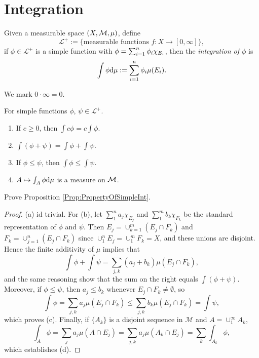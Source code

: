 \section{Integration}
\begin{defn}
    \label{Defn:IntegralOfSimpleFunc}
    Given a measurable space $(X,\mathcal{M},\mu)$, define 
    \begin{displaymath}
        \mathcal{L}^{+}:=\{\text{measurable functions }f:
        X\rightarrow[0,\infty]\},
    \end{displaymath}
    if $\phi\in \mathcal{L}^{+}$ is a simple function with 
    $\phi=\sum_{i=1}^{n}\phi_{i}\chi_{E_i}$, then 
    the \textit{integration of $\phi$} is 
    \begin{displaymath}
        \int\phi\mathrm{d}\mu:=\sum_{i=1}^{n}\phi_{i}\mu(E_i).
    \end{displaymath}
\end{defn}
\begin{rem}
    We mark $0\cdot\infty=0$.
\end{rem}
\begin{prop}
    \label{Prop:PropertyOfSimpleInt}
    For simple functions $\phi$, $\psi\in\mathcal{L}^{+}$. 
    \begin{enumerate}
        \item If $c\ge 0$, then $\int c\phi=c\int\phi$. 
        \item $\int(\phi+\psi)=\int\phi+\int\psi$.
        \item If $\phi\le\psi$, then $\int\phi\le\int\psi$. 
        \item $A\mapsto \int_{A}\phi\mathrm{d}\mu$ is a measure on $\mathcal{M}$.
    \end{enumerate}
\end{prop}
\begin{exc}
    Prove Proposition \ref{Prop:PropertyOfSimpleInt}.
\end{exc}
\begin{proof}
    (a) id trivial. For (b), let $\sum_{1}^{n}a_j\chi_{E_j}$ and 
    $\sum_{1}^{m}b_k\chi_{F_k}$ be the standard representation of 
    $\phi$ and $\psi$. Then $E_j=\cup_{k=1}^{m}(E_j\cap F_k)$ and
    $F_k=\cup_{j=1}^{n}(E_j\cap F_k)$ since $\cup_{1}^{n}E_j=
    \cup_{1}^{m}F_k=X$, and these unions are disjoint. Hence the
    finite additivity of $\mu$ implies that
    \begin{displaymath}
        \int\phi+\int\psi=\sum_{j,k}(a_j+b_k)\mu(E_j\cap F_k),
    \end{displaymath}
    and the same reasoning show that the sum on the right equals
    $\int(\phi+\psi)$. Moreover, if $\phi\leq\psi$, then $a_j\leq b_k$
    whenever $E_j\cap F_k\neq\emptyset$, so
    \begin{displaymath}
        \int\phi=\sum_{j,k}a_j\mu(E_j\cap F_k)\leq\sum_{j,k}b_k\mu(E_j\cap F_k)
        =\int\psi,
    \end{displaymath}
    which proves (c). Finally, if $\{A_k\}$ is a disjoint sequence in $\mathcal{M}$
    and $A=\cup_{1}^{\infty}A_k$,
    \begin{displaymath}
        \int_A\phi=\sum_ja_j\mu(A\cap E_j)=\sum_{j,k}a_j\mu(A_k\cap E_j)
        =\sum_k\int_{A_k}\phi,
    \end{displaymath}
    which establishes (d).
\end{proof}
